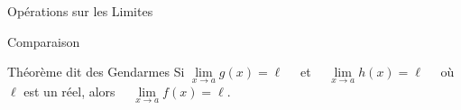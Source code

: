 \documentclass{cours}
\begin{document}
\begin{Gpartie}{Opérations sur les Limites}
\begin{Spartie}{Comparaison}
\begin{SSpartie}{Théorème dit \og des Gendarmes \fg{}}
                Si $\lim\limits_{x\to a}g(x)=\ell\quad$ et $\quad\lim\limits_{x\to a}h(x)=\ell\quad$ où $\ell$ est un réel, alors $\quad\lim\limits_{x\to a}f(x)=\ell$.
            \end{SSpartie}
        \end{Spartie}
    \end{Gpartie}
\end{document}
